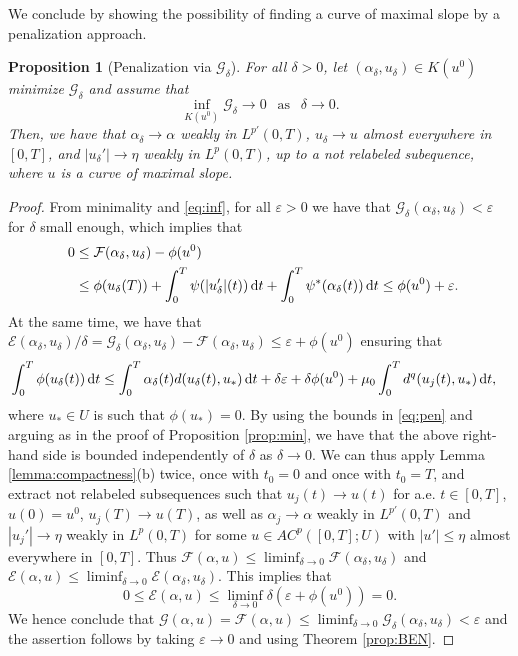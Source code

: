 \documentclass[reqno]{amsart}
\newcommand{\epsi}{\varepsilon}
\newcommand{\GG}{{\mathcal G}}
\newcommand{\EE}{{\mathcal E}}
\newcommand{\FF}{{\mathcal F}}
\renewcommand{\d}{{\rm d}}
\newtheorem{proposition}[theorem]{Proposition}
\begin{document}
 We conclude by showing the possibility of finding a curve of maximal
 slope by a penalization approach. 

 \begin{proposition}[Penalization via $\GG_\delta$]\label{prop:pen2}
   For all $\delta>0$, let $(\alpha_\delta,u_\delta)\in K(u^0)$
   minimize $\GG_\delta$ and assume that
   \begin{equation}\label{eq:inf}
    \inf_{K(u^0)} \GG_\delta \to  0  \ \ \text{ as } \ \ \delta \to 0.
\end{equation}
Then, we have that $\alpha_\delta \to \alpha$ weakly in $L^{p'}(0,T)$, $u_\delta
\to u$ almost everywhere in $[0,T]$,  and $|u_\delta'| \to \eta$ weakly in
$L^p(0,T)$, up to a not relabeled subequence, where $u$ is a curve of maximal slope.  
\end{proposition}

\begin{proof}
 From minimality and \eqref{eq:inf}, for all $\epsi >0 $ we have that $\GG_\delta
 (\alpha_\delta,u_\delta)  <\epsi$ for $\delta$ small enough,
  which implies that
  \begin{align}
     0 &\le \FF(\alpha_\delta, u_\delta)-\phi(u^0)  \nonumber\\
    \quad &\leq \phi(u_\delta(T)) + \int_0^T \psi(|u_\delta'|(t))\, \d t +
    \int_0^T\psi^*(\alpha_\delta(t))\, \d t \leq \phi(u^0) +\epsi. \label{eq:pen}
  \end{align}
  At the same time, we have that $ \EE(\alpha_\delta,u_\delta)/\delta=  \GG_\delta
 (\alpha_\delta,u_\delta) -\FF  
 (\alpha_\delta,u_\delta) \leq \epsi +\phi(u^0)$ ensuring that
 \begin{align*}
   & \int_0^T \phi(u_\delta(t))\, \d t \leq \int_0^T \alpha_\delta(t)
     d(u_\delta(t),u_*)\, \d t + \delta \epsi +\delta \phi(u^0) +
     { \mu_0  }\int_0^T d^q(u_j(t), u_*) \, \d t, 
 \end{align*} 
  where $u_* \in U$ is such that $\phi(u_*)=0$. 
 By using the bounds in \eqref{eq:pen} and arguing as in
  the proof of Proposition \ref{prop:min},  we have that the above right-hand side is bounded independently of $\delta$ as
 $\delta \to 0$.  We can thus apply Lemma \ref{lemma:compactness}(b) twice, once with $t_0=0$ and once with $t_0=T$, and extract not relabeled subsequences such that $u_j (t) \to u(t)$ for
a.e. $t \in [0,T]$, $u(0)=u^0$, $u_j(T) \to u(T)$, as well as  $\alpha_j \to \alpha$ weakly in
$L^{p'}(0,T)$ and $|u_j'|\to \eta$ weakly in $L^p(0,T)$ for some $u
\in AC^p([0,T];U)$ with $|u'| \le \eta$  almost everywhere in $[0,T]$. 
 Thus  $\FF(\alpha,u) \leq \liminf_{\delta \to
  0}\FF(\alpha_\delta,u_\delta)$ and  $\EE(\alpha,u) \leq \liminf_{\delta \to
  0}\EE (\alpha_\delta,u_\delta)$. This implies that $$0\leq \EE(\alpha,u)  \leq \liminf_{\delta \to
  0} \delta(\epsi+\phi(u^0)) =0.$$
We hence conclude that $\GG(\alpha,u) =\FF(\alpha,u)  \leq \liminf_{\delta \to
  0} \GG_\delta(\alpha_\delta,u_\delta)<\epsi$ and the assertion
follows by taking $\epsi \to 0$  and using Theorem \ref{prop:BEN}.
\end{proof}
\end{document}
